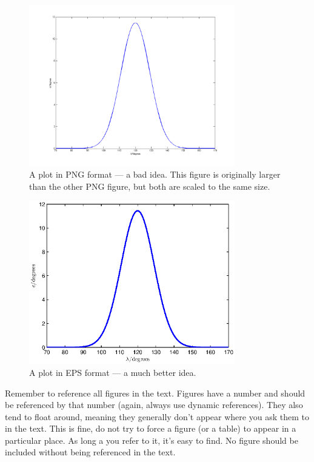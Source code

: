 \begin{figure}[htb]
	\centering
		\includegraphics[width=0.8\textwidth]{figures/constraint_png_large.png}
	\caption{A plot in PNG format --- a bad idea. This figure is originally larger than the other PNG figure, but both are scaled to the same size.}
\label{fig:constraint_png_large}
\end{figure}

\begin{figure}[htb]
	\centering
		\includegraphics[width=0.8\textwidth]{figures/constraint_eps.eps}
	\caption{A plot in EPS format --- a much better idea.}
\label{fig:constraint_eps}
\end{figure}

Remember to reference all figures in the text. Figures have a number and should be referenced by that number (again, always use dynamic references). They also tend to float around, meaning they generally don't appear where you ask them to in the text. This is fine, do not try to force a figure (or a table) to appear in a particular place. As long a you refer to it, it's easy to find. No figure should be included without being referenced in the text.

